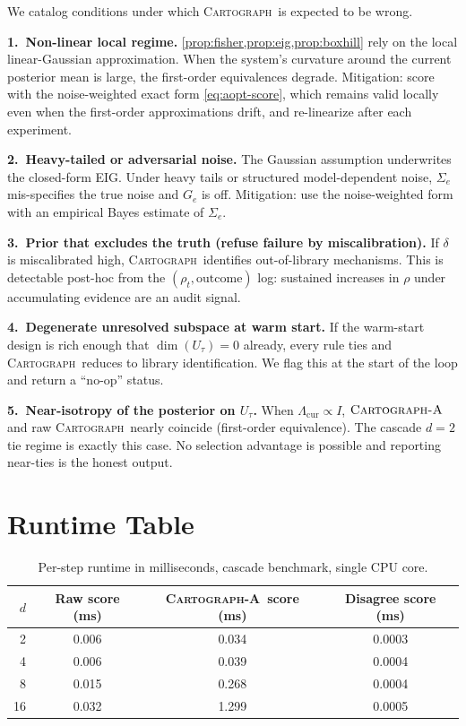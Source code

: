 \documentclass{article}
\newcommand{\method}{\textsc{Cartograph}}
\newcommand{\uopt}{\textsc{Cartograph-A}}
\theoremstyle{plain}
\theoremstyle{definition}
\theoremstyle{remark}
\begin{document}
We catalog conditions under which \method\ is expected to be wrong.

\textbf{1.~Non-linear local regime.}
\cref{prop:fisher,prop:eig,prop:boxhill} rely on the local linear-Gaussian
approximation. When the system's curvature around the current posterior
mean is large, the first-order equivalences degrade. Mitigation: score with
the noise-weighted exact form \eqref{eq:aopt-score}, which remains valid
locally even when the first-order approximations drift, and re-linearize
after each experiment.

\textbf{2.~Heavy-tailed or adversarial noise.}
The Gaussian assumption underwrites the closed-form EIG. Under heavy tails
or structured model-dependent noise, $\Sigma_e$ mis-specifies the true
noise and $G_e$ is off. Mitigation: use the noise-weighted form with an
empirical Bayes estimate of $\Sigma_e$.

\textbf{3.~Prior that excludes the truth (refuse failure by miscalibration).}
If $\delta$ is miscalibrated high, \method\ identifies out-of-library
mechanisms. This is detectable post-hoc from the
$(\rho_t,\mathrm{outcome})$ log: sustained increases in $\rho$ under
accumulating evidence are an audit signal.

\textbf{4.~Degenerate unresolved subspace at warm start.}
If the warm-start design is rich enough that $\dim(U_\tau)=0$ already,
every rule ties and \method\ reduces to library identification. We flag
this at the start of the loop and return a ``no-op'' status.

\textbf{5.~Near-isotropy of the posterior on $U_\tau$.}
When $\Lambda_{\mathrm{cur}}\propto I$, $\uopt$ and raw \method\ nearly
coincide (first-order equivalence). The cascade $d\!=\!2$ tie regime is
exactly this case. No selection advantage is possible and reporting
near-ties is the honest output.

\section{Runtime Table}
\label{app:runtimes}

\begin{table}[h]
\caption{Per-step runtime in milliseconds, cascade benchmark, single CPU
core.}
\label{tab:runtime-cascade}
\centering
\small
\begin{tabular}{r c c c}
\toprule
$d$ & Raw score (ms) & \uopt\ score (ms) & Disagree score (ms) \\
\midrule
 2 & 0.006 & 0.034 & 0.0003 \\
 4 & 0.006 & 0.039 & 0.0004 \\
 8 & 0.015 & 0.268 & 0.0004 \\
16 & 0.032 & 1.299 & 0.0005 \\
\bottomrule
\end{tabular}
\end{table}
\end{document}
